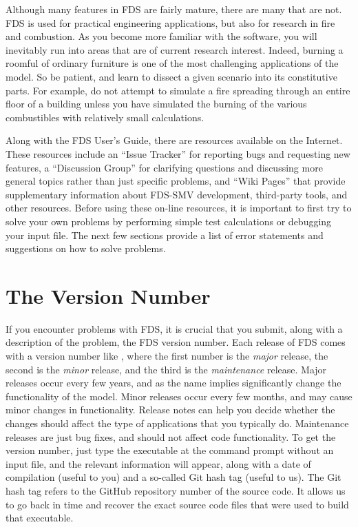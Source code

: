 \documentclass[11pt]{book}
\begin{document}
Although many features in FDS are fairly mature, there are many that are not. FDS is used for practical engineering applications, but also for research in fire and combustion. As you become more familiar with the software, you will inevitably run into areas that are of current research interest. Indeed, burning a roomful of ordinary furniture is one of the most challenging applications of the model. So be patient, and learn to dissect a given scenario into its constitutive parts. For example, do not attempt to simulate a fire spreading through an entire floor of a building unless you have simulated the burning of the various combustibles with relatively small calculations.

Along with the FDS User's Guide, there are resources available on the Internet. These resources include an ``Issue Tracker'' for reporting bugs and requesting new features, a ``Discussion Group'' for clarifying questions and discussing more general topics rather than just specific problems, and ``Wiki Pages'' that provide supplementary information about FDS-SMV development, third-party tools, and other resources. Before using these on-line resources, it is important to first try to solve your own problems by performing simple test calculations or debugging your input file. The next few sections provide a list of error statements and suggestions on how to solve problems.


\section{The Version Number}

If you encounter problems with FDS, it is crucial that you submit, along with a description of the problem, the FDS version number. Each release of FDS comes with a version number like \fdsversion, where the first number is the {\em major} release, the second is the {\em minor} release, and the third is the {\em maintenance} release. Major releases occur every few years, and as the name implies significantly change the functionality of the model. Minor releases occur every few months, and may cause minor changes in functionality. Release notes can help you decide whether the changes should affect the type of applications that you typically do. Maintenance releases are just bug fixes, and should not affect code functionality. To get the version number, just type the executable at the command prompt without an input file, and the relevant information will appear, along with a date of compilation (useful to you) and a so-called Git hash tag (useful to us).  The Git hash tag refers to the GitHub repository number of the source code. It allows us to go back in time and recover the exact source code files that were used to build that executable.
\end{document}
